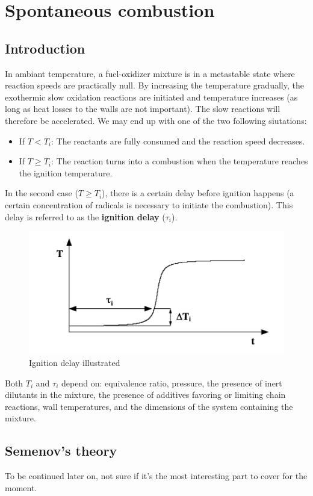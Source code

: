 \documentclass[a4paper,11pt]{article}
\begin{document}
\section{Spontaneous combustion}
\subsection{Introduction}
In ambiant temperature, a fuel-oxidizer mixture is in a metastable state where reaction speeds are practically null. By increasing the temperature gradually, the exothermic slow oxidation reactions are initiated and temperature increases (as long as heat losses to the walls are not important). The slow reactions will therefore be accelerated. We may end up with one of the two following siutations:
\begin{itemize}
	\item If $T < T_i$: The reactants are fully consumed and the reaction speed decreases.
	\item If $T \geq T_i$: The reaction turns into a combustion when the temperature reaches the ignition temperature.
\end{itemize}
In the second case ($T \geq T_i$), there is a certain delay before ignition happens (a certain concentration of radicals is necessary to initiate the combustion). This delay is referred to as the \textbf{ignition delay} ($\tau_i$).

\begin{figure}[h]
	\centering
	\includegraphics[width=.49\linewidth]{figures/autoinf.png}
	\caption{Ignition delay illustrated}
\end{figure}
\noindent
Both $T_i$ and $\tau_i$ depend on: equivalence ratio, pressure, the presence of inert dilutants in the mixture, the presence of additives favoring or limiting chain reactions, wall temperatures, and the dimensions of the system containing the mixture.\\

\subsection{Semenov's theory}
To be continued later on, not sure if it's the most interesting part to cover for the moment.
\pagebreak
\end{document}
